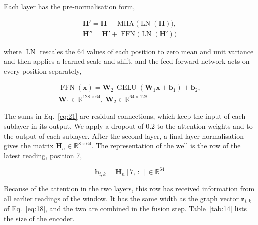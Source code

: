 \documentclass[conference]{IEEEtran}
\begin{document}
Each layer has the pre-normalisation form,

\begin{equation}
\begin{gathered}
\mathbf{H}' = \mathbf{H} + \operatorname{MHA}\!\big(\operatorname{LN}(\mathbf{H})\big), \\
\mathbf{H}'' = \mathbf{H}' + \operatorname{FFN}\!\big(\operatorname{LN}(\mathbf{H}')\big)
\end{gathered}\label{eq:21}
\end{equation}

where \(\operatorname{LN}\) rescales the 64 values of each position to zero mean and unit variance and then applies a learned scale and shift, and the feed-forward network acts on every position separately,

\begin{equation}
\begin{gathered}
\operatorname{FFN}(\mathbf{x}) = \mathbf{W}_2\,\operatorname{GELU}\!\left(\mathbf{W}_1\mathbf{x} + \mathbf{b}_1\right) + \mathbf{b}_2, \\
\mathbf{W}_1 \in \mathbb{R}^{128 \times 64},\ \mathbf{W}_2 \in \mathbb{R}^{64 \times 128}
\end{gathered}\label{eq:22}
\end{equation}

The sums in Eq.~\eqref{eq:21} are residual connections, which keep the input of each sublayer in its output. We apply a dropout of 0.2 to the attention weights and to the output of each sublayer. After the second layer, a final layer normalisation gives the matrix \(\mathbf{H}_n \in \mathbb{R}^{8 \times 64}\). The representation of the well is the row of the latest reading, position 7,

\begin{equation}
\mathbf{h}_{i,k} = \mathbf{H}_n[7,\,:\,] \in \mathbb{R}^{64}\label{eq:23}
\end{equation}

Because of the attention in the two layers, this row has received information from all earlier readings of the window. It has the same width as the graph vector \(\mathbf{z}_{i,k}\) of Eq.~\eqref{eq:18}, and the two are combined in the fusion step. Table~\ref{tab:14} lists the size of the encoder.
\end{document}
